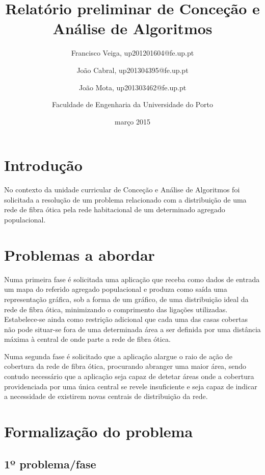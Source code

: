 \documentclass[a4paper,12pt,titlepage]{article}
\begin{document}
\title{Relatório preliminar de Conceção e Análise de Algoritmos}
\date{março 2015}
\author{Francisco Veiga, up201201604@fe.up.pt
 \and João Cabral, up201304395@fe.up.pt
 \and  João Mota, up201303462@fe.up.pt\linebreak
 \and Faculdade de Engenharia da Universidade do Porto}
%
\maketitle
\tableofcontents
\newpage
\section{Introdução}

No contexto da unidade curricular de Conceção e Análise de Algoritmos foi solicitada a resolução de um problema relacionado com a distribuição de uma rede de fibra ótica pela rede habitacional de um determinado agregado populacional.

\section{Problemas a abordar} 
Numa primeira fase é solicitada uma aplicação que receba como dados de entrada um mapa do referido agregado populacional e produza como saída uma representação gráfica, sob a forma de um gráfico, de uma distribuição ideal da rede de fibra ótica, minimizando o comprimento das ligações utilizadas. Estabelece-se ainda como restrição adicional que cada uma das casas cobertas não pode situar-se fora de uma determinada área a ser definida por uma distância máxima à central de onde parte a rede de fibra ótica.
 
Numa segunda fase é solicitado que a aplicação alargue o raio de ação de cobertura da rede de fibra ótica, procurando abranger uma maior área, sendo contudo necessário que a aplicação seja capaz de detetar áreas onde a cobertura providenciada por uma única central se revele insuficiente e seja capaz de indicar a necessidade de existirem novas centrais de distribuição da rede.

\newpage
\section{Formalização do problema}

\subsection{1º problema/fase}
\end{document}
